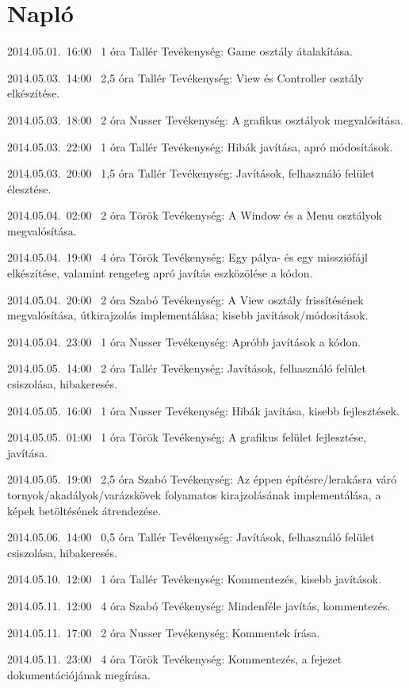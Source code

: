 %
\section{Napló}

\begin{naplo}

\bejegyzes
{2014.05.01.~16:00~}
{1 óra}
{Tallér}
{Tevékenység: Game osztály átalakítása.}

\bejegyzes
{2014.05.03.~14:00~}
{2,5 óra}
{Tallér}
{Tevékenység: View és Controller osztály elkészítése.}

\bejegyzes
{2014.05.03.~18:00~}
{2 óra}
{Nusser}
{Tevékenység: A grafikus osztályok megvalósítása.}

\bejegyzes
{2014.05.03.~22:00~}
{1 óra}
{Tallér}
{Tevékenység: Hibák javítása, apró módosítások.}

\bejegyzes
{2014.05.03.~20:00~}
{1,5 óra}
{Tallér}
{Tevékenység: Javítások, felhasználó felület élesztése.}

\bejegyzes
{2014.05.04.~02:00~}
{2 óra}
{Török}
{Tevékenység: A Window és a Menu osztályok megvalósítása.}

\bejegyzes
{2014.05.04.~19:00~}
{4 óra}
{Török}
{Tevékenység: Egy pálya- és egy missziófájl elkészítése, valamint rengeteg apró javítás eszközölése a kódon.}

\bejegyzes
{2014.05.04.~20:00~}
{2 óra}
{Szabó}
{Tevékenység: A View osztály frissítésének megvalósítása, útkirajzolás implementálása; kisebb javítások/módosítások.}

\bejegyzes
{2014.05.04.~23:00~}
{1 óra}
{Nusser}
{Tevékenység: Apróbb javítások a kódon.}

\bejegyzes
{2014.05.05.~14:00~}
{2 óra}
{Tallér}
{Tevékenység: Javítások, felhasználó felület csiszolása, hibakeresés.}

\bejegyzes
{2014.05.05.~16:00~}
{1 óra}
{Nusser}
{Tevékenység: Hibák javítása, kisebb fejlesztések.}

\bejegyzes
{2014.05.05.~01:00~}
{1 óra}
{Török}
{Tevékenység: A grafikus felület fejlesztése, javítása.}


\bejegyzes
{2014.05.05.~19:00~}
{2,5 óra}
{Szabó}
{Tevékenység: Az éppen építésre/lerakásra váró tornyok/akadályok/varázskövek folyamatos kirajzolásának implementálása, a képek betöltésének átrendezése.}

\bejegyzes
{2014.05.06.~14:00~}
{0,5 óra}
{Tallér}
{Tevékenység: Javítások, felhasználó felület csiszolása, hibakeresés.}

\bejegyzes
{2014.05.10.~12:00~}
{1 óra}
{Tallér}
{Tevékenység: Kommentezés, kisebb javítások.}

\bejegyzes
{2014.05.11.~12:00~}
{4 óra}
{Szabó}
{Tevékenység: Mindenféle javítás, kommentezés.}

\bejegyzes
{2014.05.11.~17:00~}
{2 óra}
{Nusser}
{Tevékenység: Kommentek írása.}

\bejegyzes
{2014.05.11.~23:00~}
{4 óra}
{Török}
{Tevékenység: Kommentezés, a fejezet dokumentációjának megírása.}


\end{naplo}

